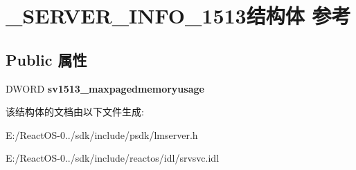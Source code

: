 \hypertarget{struct___s_e_r_v_e_r___i_n_f_o__1513}{}\section{\+\_\+\+S\+E\+R\+V\+E\+R\+\_\+\+I\+N\+F\+O\+\_\+1513结构体 参考}
\label{struct___s_e_r_v_e_r___i_n_f_o__1513}
\subsection*{Public 属性}
\begin{DoxyCompactItemize}
\item 
\mbox{\label{struct___s_e_r_v_e_r___i_n_f_o__1513_a1ed8666cb8da860a135be3de4f4c38a1}} 
D\+W\+O\+RD {\bfseries sv1513\+\_\+maxpagedmemoryusage}
\end{DoxyCompactItemize}


该结构体的文档由以下文件生成\+:\begin{DoxyCompactItemize}
\item 
E\+:/\+React\+O\+S-\/0../sdk/include/psdk/lmserver.\+h\item 
E\+:/\+React\+O\+S-\/0../sdk/include/reactos/idl/srvsvc.\+idl\end{DoxyCompactItemize}
